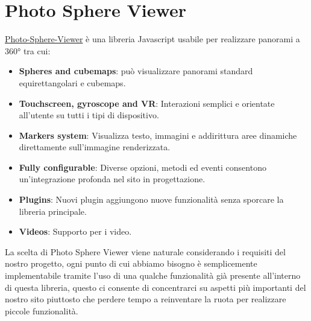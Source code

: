 \documentclass[a4paper,12pt]{report}
\newcommand{\photosphereviewer}{\href{https://photo-sphere-viewer.js.org/}{Photo-Sphere-Viewer} }
\begin{document}
\section{Photo Sphere Viewer}
\photosphereviewer è una libreria Javascript usabile per realizzare panorami a 360° tra cui:
\begin{itemize}
	\item \textbf{Spheres and cubemaps}: può visualizzare panorami standard equirettangolari e cubemaps.
	\item \textbf{Touchscreen, gyroscope and VR}: Interazioni semplici e orientate all'utente su tutti i tipi di dispositivo.
	\item \textbf{Markers system}: Visualizza testo, immagini e addirittura aree dinamiche direttamente sull'immagine renderizzata.
	\item \textbf{Fully configurable}: Diverse opzioni, metodi ed eventi consentono un'integrazione profonda nel sito in progettazione.
	\item \textbf{Plugins}: Nuovi plugin aggiungono nuove funzionalità senza sporcare la libreria principale.
	\item \textbf{Videos}: Supporto per i video.
\end{itemize}
La scelta di Photo Sphere Viewer viene naturale considerando i requisiti del nostro progetto, ogni punto di cui abbiamo bisogno è semplicemente implementabile tramite l'uso di una qualche funzionalità già presente all'interno di questa libreria, questo ci consente di concentrarci su aspetti più importanti del nostro sito piuttosto che perdere tempo a reinventare la ruota per realizzare piccole funzionalità.
\end{document}
